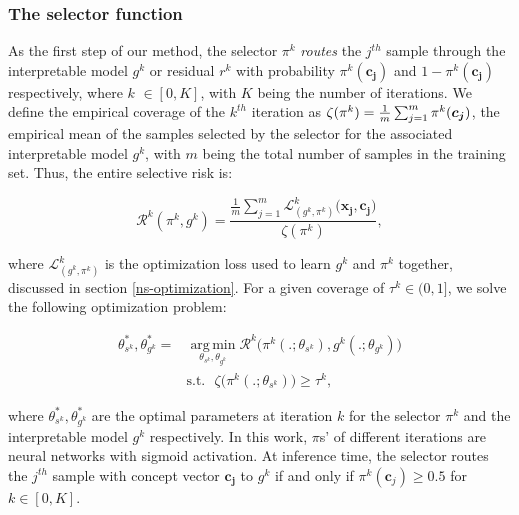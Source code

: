 \subsubsection{The selector function}
As the first step of our method, the selector $\pi^k$ \emph{routes} the $j^{th}$ sample through the interpretable model $g^k$ or residual $r^k$ with probability $\displaystyle \pi^k(\boldsymbol{c_j})$ and $\displaystyle 1 - \pi^k(\boldsymbol{c_j})$ respectively, where $k$ $\in [0,K]$, with $K$ being the number of iterations.
We define the empirical coverage of the $\displaystyle k^{th}$ iteration as $\vspace{-0.08pt} \zeta(\pi^k) = \frac{1}{m}\sum_{j = 1} ^ m \pi^k(\boldsymbol{c_j}) \vspace{-0.081pt}$, the empirical mean of the samples selected by the selector for the associated interpretable model $\displaystyle g^k$, with $\displaystyle m$ being the total number of samples in the training set. Thus, the entire selective risk is:

\vskip -7.5pt
\begin{equation}
\label{equ: emp_risk}
\mathcal{R}^k(\displaystyle \pi^k, \displaystyle g^k) = \frac{\frac{1}{m}\sum_{j=1}^m\mathcal{L}_{(g^k, \pi^k)}^k\big(\boldsymbol{x_j}, \boldsymbol{c_j}\big)}{\zeta(\pi^k)} ,
\end{equation}
\vskip 2pt

where $\mathcal{L}_{(g^k, \pi^k)}^k$ is the optimization loss used to learn $\displaystyle g^k$ and $\displaystyle \pi^k$ together, discussed in section \ref{ns-optimization}. For a given coverage of $\displaystyle \tau^k \in (0, 1]$, we solve the following optimization problem:

\vskip -7.5pt
\begin{align}
\label{equ: optimization_g}
\theta_{s^k}^*, \theta_{g^k}^* = & \operatorname*{arg\,min}_{\theta_{s^k}, \theta_{g^k}} \mathcal{R}^k\Big(\pi^k(.; \theta_{s^k}), \displaystyle g^k(.; \theta_{g^k}) \Big) \nonumber \\ 
&\text{s.t.} ~~~ \zeta\big(\pi^k(.; \theta_{s^k})\big) \geq \tau^k,
\end{align}
\vskip 2pt

where $\theta_{s^k}^*, \theta_{g^k}^*$ are the optimal parameters at iteration $k$ for the selector $\pi^k$ and the interpretable model $g^k$ respectively. In this work, $\pi$s' of different iterations are neural networks with sigmoid activation. At inference time, the selector routes the $j^{th}$ sample with concept vector $\boldsymbol{c_j}$ to $\displaystyle g^k$ if and only if $\pi^k(\boldsymbol{c}_j)\geq 0.5$ for $k \in [0,K]$.

